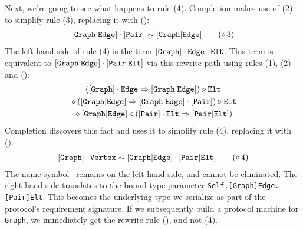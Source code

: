 \documentclass[../generics]{subfiles}
\begin{document}
\begin{example}
Next, we're going to see what happens to rule (4). Completion makes use of (2) to simplify rule (3), replacing it with ():
\begin{gather*}
\ConfRule{\aEd}{\pPair}\tag{\CRule{3}}
\end{gather*}
The left-hand side of rule (4) is the term $[\texttt{Graph}] \cdot \texttt{Edge} \cdot \texttt{Elt}$. This term is equivalent to $[\texttt{Graph}|\texttt{Edge}] \cdot [\texttt{Pair}|\texttt{Elt}]$ via this rewrite path using rules (1), (2) and ():
\begin{gather*}
([\texttt{Graph}] \cdot \texttt{Edge} \Rightarrow [\texttt{Graph}|\texttt{Edge}]) \triangleright \texttt{Elt}\\
{} \circ ([\texttt{Graph}|\texttt{Edge}] \Rightarrow [\texttt{Graph}|\texttt{Edge}] \cdot [\texttt{Pair}]) \triangleright \texttt{Elt}\\
{} \circ [\texttt{Graph}|\texttt{Edge}] \triangleleft ([\texttt{Pair}] \cdot \texttt{Elt} \Rightarrow [\texttt{Pair}|\texttt{Elt}])
\end{gather*}
Completion discovers this fact and uses it to simplify rule (4), replacing it with ():
\begin{gather*}
\SameRule{\pGraph \cdot \nV}{\aEd \cdot \aEl}\tag{\CRule{4}}
\end{gather*}
The name symbol \nV\ remains on the left-hand side, and cannot be eliminated. The right-hand side translates to the bound type parameter \texttt{Self.[Graph]Edge.[Pair]Elt}. This becomes the underlying type we serialize as part of the protocol's requirement signature. If we subsequently build a protocol machine for \texttt{Graph}, we immediately get the rewrite rule (), and not (4).
\end{example}
\end{document}
